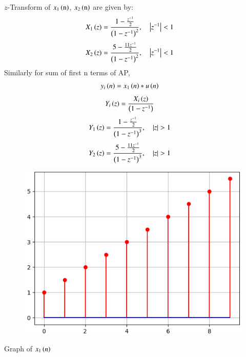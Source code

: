 \documentclass[beamer]{IEEEtran}
\theoremstyle{remark}
\begin{document}
$z$-Transform of $x_1\left(\text{n}\right)$, $x_2\left(\text{n}\right)$ are given by:
\begin{align} X_1\left(z\right)&=\frac{1-\frac{z^{-1}}{2}}{\left(1-z^{-1}\right)^2},\quad \left\vert z^{-1}\right\vert<1
\end{align}
\begin{align}X_2\left(z\right)&=\frac{5-\frac{11z^{-1}}{2}}{\left(1-z^{-1}\right)^2},\quad \left\vert z^{-1}\right\vert<1
\end{align}
Similarly for sum of first n terms of AP,
\begin{align}
y_i\left(n\right)&=x_1\left(n\right)*u\left(n\right)
\end{align}
\begin{align}
\label{w1}
Y_i\left(z\right)&=\frac{X_i\left(z\right)}{\left(1-z^{-1}\right)}
\end{align}
\begin{align}
Y_1\left(z\right)&=\frac{1-\frac{z^{-1}}{2}}{\left(1-z^{-1}\right)^3},\quad \left\vert z\right\vert>1
\end{align}
\begin{align}Y_2\left(z\right)&=\frac{5-\frac{11z^{-1}}{2}}{\left(1-z^{-1}\right)^3},\quad \left\vert z\right\vert>1
\end{align}
\begin{figure}[h]
    \centering
    \includegraphics[scale=0.60]{figs/py_3.png}
    \label{fig:x1n}
\end{figure}
\begin{center}
    Graph of $x_1\left(n\right)$
\end{center}
\end{document}
